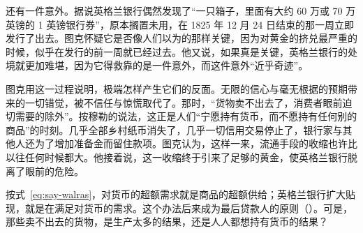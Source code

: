 还有一件意外。据说英格兰银行偶然发现了“一只箱子，里面有大约 60 万或 70 万英镑的 1 英镑银行券”，原本搁置未用，在 1825 年 12 月 24 日结束的那一周立即发行了出去\cite{tooke1838v2}。图克怀疑它是否像人们以为的那样关键，因为对黄金的挤兑最严重的时候，似乎在发行的前一周就已经过去。他又说，如果真是关键，英格兰银行的处境就更加难堪，因为它得救靠的是一件意外，而这件意外“近乎奇迹”\cite{tooke1838v2}。

图克用这一过程说明，极端怎样产生它们的反面。无限的信心与毫无根据的预期带来的一切错觉，被不信任与惊慌取代了\cite{tooke1838v2}。那时，“货物卖不出去了，消费者眼前迫切需要的除外”\cite{tooke1838v2}。按穆勒的说法，这正是人们“宁愿持有货币，而不愿持有任何别的商品”的时刻。几乎全部乡村纸币消失了，几乎一切信用交易停止了，银行家与其他人还为了增加准备金而留住款项。图克认为，这样一来，流通手段的收缩也许比以往任何时候都大\cite{tooke1838v2}。他接着说，这一收缩终于引来了足够的黄金，使英格兰银行脱离了眼前的危险\cite{tooke1838v2}。

按式~\eqref{eq:say-walras}，对货币的超额需求就是商品的超额供给；英格兰银行扩大贴现，就是在满足对货币的需求。这个办法后来成为最后贷款人的原则（）。可是，那些卖不出去的货物，是生产太多的结果，还是人人都想持有货币的结果？


